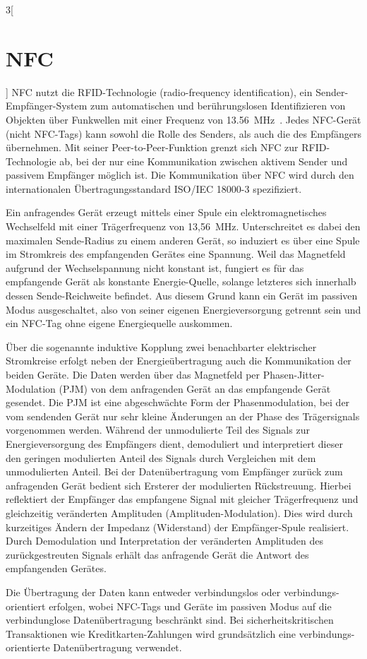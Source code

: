 \begin{multicols}{3}[\section{NFC}]
NFC nutzt die RFID-Technologie (radio-frequency identification), ein Sender-Empfänger-System zum automatischen und berührungslosen Identifizieren von Objekten über Funkwellen mit einer Frequenz von 13.56~MHz~\cite{nfc.9}. Jedes NFC-Gerät (nicht NFC-Tags) kann sowohl die Rolle des Senders, als auch die des Empfängers übernehmen. Mit seiner Peer-to-Peer-Funktion grenzt sich NFC zur RFID-Technologie ab, bei der nur eine Kommunikation zwischen aktivem Sender und passivem Empfänger möglich ist. Die Kommunikation über NFC wird durch den internationalen Übertragungsstandard ISO/IEC 18000-3 spezifiziert.

Ein anfragendes Gerät erzeugt mittels einer Spule ein elektromagnetisches Wechselfeld mit einer Trägerfrequenz von 13,56~MHz. Unterschreitet es dabei den maximalen Sende-Radius zu einem anderen Gerät, so induziert es über eine Spule im Stromkreis des empfangenden Gerätes eine Spannung. Weil das Magnetfeld aufgrund der Wechselspannung nicht konstant ist, fungiert es für das empfangende Gerät als konstante Energie-Quelle, solange letzteres sich innerhalb dessen Sende-Reichweite befindet. Aus diesem Grund kann ein Gerät im passiven Modus ausgeschaltet, also von seiner eigenen Energieversorgung getrennt sein und ein NFC-Tag ohne eigene Energiequelle auskommen.

Über die sogenannte induktive Kopplung zwei benachbarter elektrischer Stromkreise erfolgt neben der Energieübertragung auch die Kommunikation der beiden Geräte. Die Daten werden über das Magnetfeld per Phasen-Jitter-Modulation (PJM) von dem anfragenden Gerät an das empfangende Gerät gesendet. Die PJM ist eine abgeschwächte Form der Phasenmodulation, bei der vom sendenden Gerät nur sehr kleine Änderungen an der Phase des Trägersignals vorgenommen werden. Während der unmodulierte Teil des Signals zur Energieversorgung des Empfängers dient, demoduliert und interpretiert dieser den geringen modulierten Anteil des Signals durch Vergleichen mit dem unmodulierten Anteil. Bei der Datenübertragung vom Empfänger zurück zum anfragenden Gerät bedient sich Ersterer der modulierten Rückstreuung. Hierbei reflektiert der Empfänger das empfangene Signal mit gleicher Trägerfrequenz und gleichzeitig veränderten Amplituden (Amplituden-Modulation). Dies wird durch kurzeitiges Ändern der Impedanz (Widerstand) der Empfänger-Spule realisiert. Durch Demodulation und Interpretation der veränderten Amplituden des zurückgestreuten Signals erhält das anfragende Gerät die Antwort des empfangenden Gerätes.
 
Die Übertragung der Daten kann entweder verbindungslos oder verbindungs-orientiert erfolgen, wobei NFC-Tags und Geräte im passiven Modus auf die verbindunglose Datenübertragung beschränkt sind. Bei sicherheitskritischen Transaktionen wie Kreditkarten-Zahlungen wird grundsätzlich eine verbindungs-orientierte Datenübertragung verwendet.~\cite{nfc.3,nfc.4,nfc.5,nfc.6,nfc.7,nfc.8}



\end{multicols}

